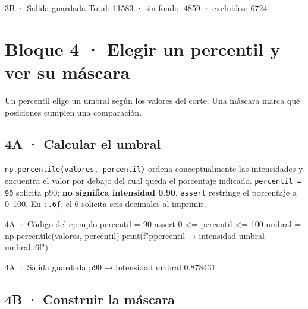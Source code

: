 \begin{Salida}{3B · Salida guardada}
Total: 11583 · sin fondo: 4859 · excluidos: 6724
\end{Salida}


\clearpage

\section*{Bloque 4 · Elegir un percentil y ver su máscara}


\label{vivo:bloque4}

Un percentil elige un umbral según los valores del corte. Una máscara marca qué posiciones cumplen una comparación.


\subsection*{4A · Calcular el umbral}

\label{vivo:4a}

\texttt{\small np.\allowbreak{}percentile(\allowbreak{}valores,\allowbreak{} percentil)\allowbreak{}} ordena conceptualmente las intensidades y encuentra el valor por debajo del cual queda el porcentaje indicado. \texttt{\small percentil = 90} solicita p90; \textbf{no significa intensidad 0.90}. \texttt{\small assert} restringe el porcentaje a 0–100. En \texttt{\small :.\allowbreak{}6f}, el 6 solicita seis decimales al imprimir.

\begin{CodigoVivo}{4A · Código del ejemplo}
percentil = 90
assert 0 <= percentil <= 100
umbral = np.percentile(valores, percentil)
print(f"p{percentil} → intensidad umbral {umbral:.6f}")
\end{CodigoVivo}


\begin{Salida}{4A · Salida guardada}
p90 → intensidad umbral 0.878431
\end{Salida}



\subsection*{4B · Construir la máscara}

\label{vivo:4b}


